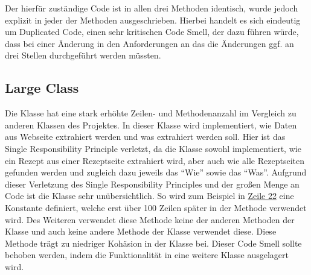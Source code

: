 Der hierfür zuständige Code ist in allen drei Methoden identisch, wurde jedoch explizit in jeder der Methoden ausgeschrieben. Hierbei handelt es sich eindeutig um Duplicated Code, einen sehr kritischen Code Smell, der dazu führen würde, dass bei einer Änderung in den Anforderungen an das  die Änderungen ggf. an drei Stellen durchgeführt werden müssten.

\subsection{Large Class}
Die Klasse \href{https://github.com/anditru/quickie/blob/bb41442c7f1ffbfcd3117cd86a40f7932e543a33/0-quickie-plugin-scraper/src/main/java/org/pinkcrazyunicorn/quickie/plugins/scraper/HensslerScraper.java}{} hat eine stark erhöhte Zeilen- und Methodenanzahl im Vergleich zu anderen Klassen des Projektes. In dieser Klasse wird implementiert, wie Daten aus Webseite extrahiert werden und was extrahiert werden soll. Hier ist das Single Responsibility Principle verletzt, da die Klasse sowohl implementiert, wie ein Rezept aus einer Rezeptseite extrahiert wird, aber auch wie alle Rezeptseiten gefunden werden und zugleich dazu jeweils das \enquote{Wie} sowie das \enquote{Was}. Aufgrund dieser Verletzung des Single Responsibility Principles und der großen Menge an Code ist die Klasse sehr unübersichtlich. So wird zum Beispiel in \href{https://github.com/anditru/quickie/blob/bb41442c7f1ffbfcd3117cd86a40f7932e543a33/0-quickie-plugin-scraper/src/main/java/org/pinkcrazyunicorn/quickie/plugins/scraper/HensslerScraper.java#L22}{Zeile 22} eine Konstante definiert, welche erst über 100 Zeilen später in der Methode \href{https://github.com/anditru/quickie/blob/bb41442c7f1ffbfcd3117cd86a40f7932e543a33/0-quickie-plugin-scraper/src/main/java/org/pinkcrazyunicorn/quickie/plugins/scraper/HensslerScraper.java#L149}{} verwendet wird. Des Weiteren verwendet diese Methode keine der anderen Methoden der Klasse und auch keine andere Methode der Klasse verwendet diese. Diese Methode trägt zu niedriger Kohäsion in der Klasse bei. Dieser Code Smell sollte behoben werden, indem die Funktionalität in eine weitere Klasse ausgelagert wird.

